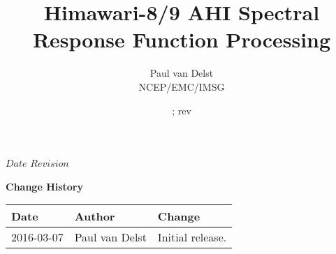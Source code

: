 



\SVN $Date$
\SVN $Revision$

\title{Himawari-8/9 AHI Spectral Response Function Processing}
\author{Paul van Delst\\NCEP/EMC/IMSG}
\date{\SVNDate ; rev\SVNRevision}



\maketitle


\thispagestyle{empty}
\vspace*{10cm}
\begin{center}
  {\sffamily\Large\bfseries Change History}
  \begin{table}[htp]
    \centering
    \begin{tabular}{|p{2cm}|p{3cm}|p{8cm}|}
      \hline
      \sffamily\textbf{Date} & \sffamily\textbf{Author} & \sffamily\textbf{Change}\\
      \hline\hline
      2016-03-07 & Paul van Delst & Initial release.\\
      \hline
    \end{tabular}
  \end{table}
\end{center}
\clearpage

\pagestyle{fancy}
\fancyhead[LE,RO]{\sffamily \rightmark}
\fancyhead[LO,RE]{\sffamily \leftmark}

\setcounter{page}{1}
  \tableofcontents\newpage
  \listoffigures\newpage
  \listoftables\newpage
{}
\setcounter{page}{1}





